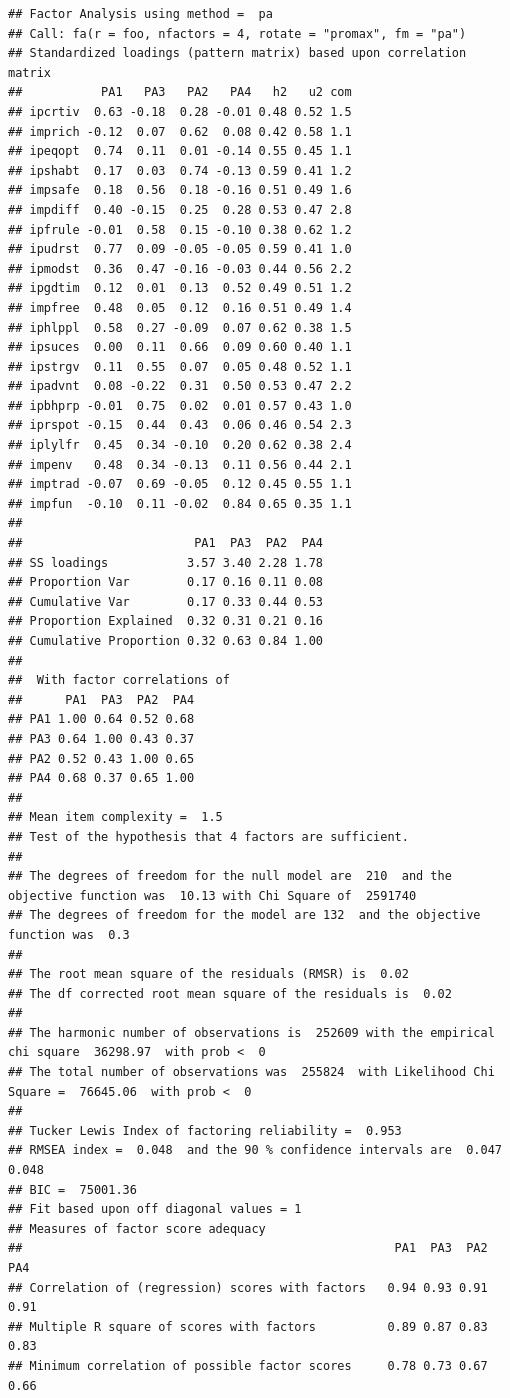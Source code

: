 \documentclass[
]{book}
\begin{document}
\begin{verbatim}
## Factor Analysis using method =  pa
## Call: fa(r = foo, nfactors = 4, rotate = "promax", fm = "pa")
## Standardized loadings (pattern matrix) based upon correlation matrix
##           PA1   PA3   PA2   PA4   h2   u2 com
## ipcrtiv  0.63 -0.18  0.28 -0.01 0.48 0.52 1.5
## imprich -0.12  0.07  0.62  0.08 0.42 0.58 1.1
## ipeqopt  0.74  0.11  0.01 -0.14 0.55 0.45 1.1
## ipshabt  0.17  0.03  0.74 -0.13 0.59 0.41 1.2
## impsafe  0.18  0.56  0.18 -0.16 0.51 0.49 1.6
## impdiff  0.40 -0.15  0.25  0.28 0.53 0.47 2.8
## ipfrule -0.01  0.58  0.15 -0.10 0.38 0.62 1.2
## ipudrst  0.77  0.09 -0.05 -0.05 0.59 0.41 1.0
## ipmodst  0.36  0.47 -0.16 -0.03 0.44 0.56 2.2
## ipgdtim  0.12  0.01  0.13  0.52 0.49 0.51 1.2
## impfree  0.48  0.05  0.12  0.16 0.51 0.49 1.4
## iphlppl  0.58  0.27 -0.09  0.07 0.62 0.38 1.5
## ipsuces  0.00  0.11  0.66  0.09 0.60 0.40 1.1
## ipstrgv  0.11  0.55  0.07  0.05 0.48 0.52 1.1
## ipadvnt  0.08 -0.22  0.31  0.50 0.53 0.47 2.2
## ipbhprp -0.01  0.75  0.02  0.01 0.57 0.43 1.0
## iprspot -0.15  0.44  0.43  0.06 0.46 0.54 2.3
## iplylfr  0.45  0.34 -0.10  0.20 0.62 0.38 2.4
## impenv   0.48  0.34 -0.13  0.11 0.56 0.44 2.1
## imptrad -0.07  0.69 -0.05  0.12 0.45 0.55 1.1
## impfun  -0.10  0.11 -0.02  0.84 0.65 0.35 1.1
## 
##                        PA1  PA3  PA2  PA4
## SS loadings           3.57 3.40 2.28 1.78
## Proportion Var        0.17 0.16 0.11 0.08
## Cumulative Var        0.17 0.33 0.44 0.53
## Proportion Explained  0.32 0.31 0.21 0.16
## Cumulative Proportion 0.32 0.63 0.84 1.00
## 
##  With factor correlations of 
##      PA1  PA3  PA2  PA4
## PA1 1.00 0.64 0.52 0.68
## PA3 0.64 1.00 0.43 0.37
## PA2 0.52 0.43 1.00 0.65
## PA4 0.68 0.37 0.65 1.00
## 
## Mean item complexity =  1.5
## Test of the hypothesis that 4 factors are sufficient.
## 
## The degrees of freedom for the null model are  210  and the objective function was  10.13 with Chi Square of  2591740
## The degrees of freedom for the model are 132  and the objective function was  0.3 
## 
## The root mean square of the residuals (RMSR) is  0.02 
## The df corrected root mean square of the residuals is  0.02 
## 
## The harmonic number of observations is  252609 with the empirical chi square  36298.97  with prob <  0 
## The total number of observations was  255824  with Likelihood Chi Square =  76645.06  with prob <  0 
## 
## Tucker Lewis Index of factoring reliability =  0.953
## RMSEA index =  0.048  and the 90 % confidence intervals are  0.047 0.048
## BIC =  75001.36
## Fit based upon off diagonal values = 1
## Measures of factor score adequacy             
##                                                    PA1  PA3  PA2  PA4
## Correlation of (regression) scores with factors   0.94 0.93 0.91 0.91
## Multiple R square of scores with factors          0.89 0.87 0.83 0.83
## Minimum correlation of possible factor scores     0.78 0.73 0.67 0.66
\end{verbatim}
\end{document}
